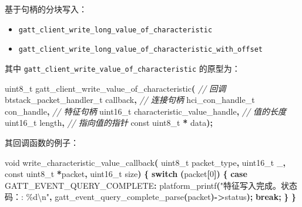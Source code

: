 \documentclass[
  12pt,
]{book}
\newenvironment{Shaded}{\begin{snugshade}}{\end{snugshade}}
\newcommand{\CommentTok}[1]{\textcolor[rgb]{0.56,0.35,0.01}{\textit{#1}}}
\newcommand{\ControlFlowTok}[1]{\textcolor[rgb]{0.13,0.29,0.53}{\textbf{#1}}}
\newcommand{\DataTypeTok}[1]{\textcolor[rgb]{0.13,0.29,0.53}{#1}}
\newcommand{\DecValTok}[1]{\textcolor[rgb]{0.00,0.00,0.81}{#1}}
\newcommand{\NormalTok}[1]{#1}
\newcommand{\OperatorTok}[1]{\textcolor[rgb]{0.81,0.36,0.00}{\textbf{#1}}}
\newcommand{\SpecialCharTok}[1]{\textcolor[rgb]{0.00,0.00,0.00}{#1}}
\newcommand{\StringTok}[1]{\textcolor[rgb]{0.31,0.60,0.02}{#1}}
\providecommand{\tightlist}{%
  \setlength{\itemsep}{0pt}\setlength{\parskip}{0pt}}
\begin{document}
基于句柄的分块写入：

\begin{itemize}
\tightlist
\item
  \texttt{gatt\_client\_write\_long\_value\_of\_characteristic}
\item
  \texttt{gatt\_client\_write\_long\_value\_of\_characteristic\_with\_offset}
\end{itemize}

其中 \texttt{gatt\_client\_write\_value\_of\_characteristic} 的原型为：

\begin{Shaded}
\begin{Highlighting}[]
\DataTypeTok{uint8\_t}\NormalTok{ gatt\_client\_write\_value\_of\_characteristic}\OperatorTok{(}
    \CommentTok{// 回调}
\NormalTok{    btstack\_packet\_handler\_t callback}\OperatorTok{,}
    \CommentTok{// 连接句柄}
\NormalTok{    hci\_con\_handle\_t con\_handle}\OperatorTok{,}
    \CommentTok{// 特征句柄}
    \DataTypeTok{uint16\_t}\NormalTok{ characteristic\_value\_handle}\OperatorTok{,}
    \CommentTok{// 值的长度}
    \DataTypeTok{uint16\_t}\NormalTok{ length}\OperatorTok{,}
    \CommentTok{// 指向值的指针}
    \DataTypeTok{const} \DataTypeTok{uint8\_t} \OperatorTok{*}\NormalTok{ data}\OperatorTok{);}
\end{Highlighting}
\end{Shaded}

其回调函数的例子：

\begin{Shaded}
\begin{Highlighting}[]
\DataTypeTok{void}\NormalTok{ write\_characteristic\_value\_callback}\OperatorTok{(}
    \DataTypeTok{uint8\_t}\NormalTok{ packet\_type}\OperatorTok{,} \DataTypeTok{uint16\_t}\NormalTok{ \_}\OperatorTok{,}
    \DataTypeTok{const} \DataTypeTok{uint8\_t} \OperatorTok{*}\NormalTok{packet}\OperatorTok{,} \DataTypeTok{uint16\_t}\NormalTok{ size}\OperatorTok{)}
\OperatorTok{\{}
    \ControlFlowTok{switch} \OperatorTok{(}\NormalTok{packet}\OperatorTok{[}\DecValTok{0}\OperatorTok{])}
    \OperatorTok{\{}
    \ControlFlowTok{case}\NormalTok{ GATT\_EVENT\_QUERY\_COMPLETE}\OperatorTok{:}
\NormalTok{        platform\_printf}\OperatorTok{(}\StringTok{"特征写入完成。状态码：: \%d}\SpecialCharTok{\textbackslash{}n}\StringTok{"}\OperatorTok{,}
\NormalTok{            gatt\_event\_query\_complete\_parse}\OperatorTok{(}\NormalTok{packet}\OperatorTok{){-}\textgreater{}}\NormalTok{status}\OperatorTok{);}
        \ControlFlowTok{break}\OperatorTok{;}
    \OperatorTok{\}}
\OperatorTok{\}}
\end{Highlighting}
\end{Shaded}
\end{document}
